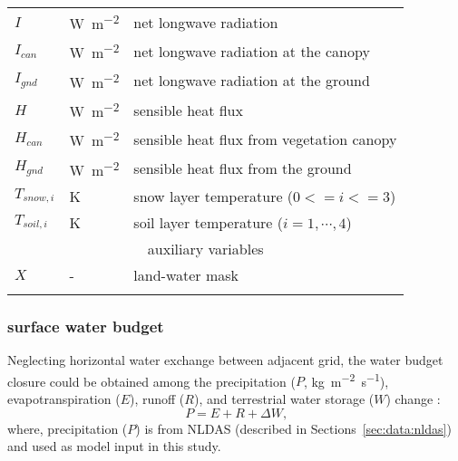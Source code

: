\documentclass[essd]{copernicus}
\begin{document}
\begin{table}[t]
\begin{tabular}{lll}
        $I$          & \unit{W~m^{-2}}         & net longwave radiation                    \\
        $I_{can}$    & \unit{W~m^{-2}}         & net longwave radiation at the canopy      \\
        $I_{gnd}$    & \unit{W~m^{-2}}         & net longwave radiation at the ground      \\
        $H$          & \unit{W~m^{-2}}         & sensible heat flux                        \\
        $H_{can}$    & \unit{W~m^{-2}}         & sensible heat flux from vegetation canopy \\
        $H_{gnd}$    & \unit{W~m^{-2}}         & sensible heat flux from the ground        \\
        $T_{snow,i}$ & \unit{K}                & snow layer temperature ($0<=i<=3$)        \\
        $T_{soil,i}$ & \unit{K}                & soil layer temperature ($i=1,\cdots,4$)   \\
        [1pt]
        \multicolumn{3}{c}{auxiliary variables}                                            \\
        $X$          & \unit{-}                & land-water mask                           \\
        \bottomhline
    \end{tabular}
\end{table}


\subsubsection{surface water budget}

Neglecting horizontal water exchange between adjacent grid, the water budget
closure could be obtained among the precipitation ($P$,
\unit{kg~m^{-2}~s^{-1}}), evapotranspiration ($E$), runoff ($R$), and
terrestrial water storage ($W$) change \citep{zheng2020JAMES}:
\begin{equation}
    P = E + R + \Delta W \text{,}
\end{equation}
where, precipitation ($P$) is from NLDAS (described in
Sections~\ref{sec:data:nldas}) and used as model input in this study.
\end{document}
